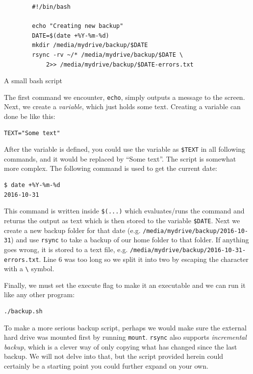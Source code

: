 \begin{listing}
	\begin{verbatim}
		#!/bin/bash

		echo "Creating new backup"
		DATE=$(date +%Y-%m-%d)
		mkdir /media/mydrive/backup/$DATE
		rsync -rv ~/* /media/mydrive/backup/$DATE \
			2>> /media/mydrive/backup/$DATE-errors.txt
	\end{verbatim}
	\caption{A small bash script}
	\label{lst:bash:script}
\end{listing}
The first command we encounter, \verb|echo|, simply outputs a message to the screen. Next, we create a \emph{variable}, which just holds some text. Creating a variable can done be like this:

\begin{verbatim}
TEXT="Some text"
\end{verbatim}
After the variable is defined, you could use the variable as \verb|$TEXT| in all following commands, and it would be replaced by ``Some text''. The script is somewhat more complex. The following command is used to get the current date:

\begin{verbatim}
$ date +%Y-%m-%d
2016-10-31
\end{verbatim}
This command is written inside \verb|$(...)| which evaluates/runs the command and returns the output as text which is then stored to the variable \verb|$DATE|. Next we create a new backup folder for that date (e.g. \verb|/media/mydrive/backup/2016-10-31|) and use \verb|rsync| to take a backup of our home folder to that folder. If anything goes wrong, it is stored to a text file, e.g. \verb|/media/mydrive/backup/2016-10-31-errors.txt|. Line 6 was too long so we split it into two by escaping the character with a \verb|\| symbol.

Finally, we must set the execute flag to make it an executable and we can run it like any other program:
\begin{verbatim}
./backup.sh
\end{verbatim}

To make a more serious backup script, perhaps we would make sure the external hard drive was mounted first by running \verb|mount|. \verb|rsync| also supports \emph{incremental backup}, which is a clever way of only copying what has changed since the last backup. We will not delve into that, but the script provided herein could certainly be a starting point you could further expand on your own.

